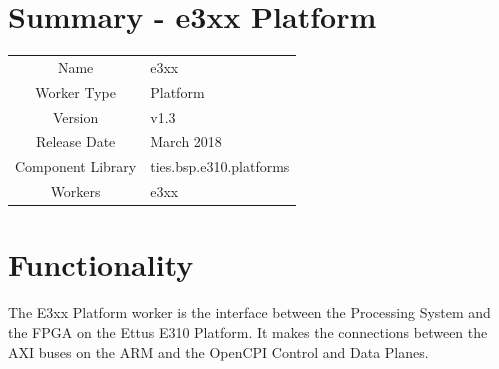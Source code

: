 \documentclass{article}
\author{} %
\date{Version \docVersion} %
\title{\docTitle}
\def\docVersion{1.3}
\def\comp{e3xx}
\def\Comp{e3xx Platform}
\begin{document}
\section*{Summary - \Comp}
\begin{tabular}{|c|M{13.5cm}|}
	\hline
	                  &                                                    \\
	\hline
	Name              & \comp                                              \\
	\hline
	Worker Type       & Platform                                           \\
	\hline
	Version           & v\docVersion \\
	\hline
	Release Date      & March 2018 \\
	\hline
	Component Library & ties.bsp.e310.platforms                                \\
	\hline
	Workers & \comp                                        \\
	\hline
\end{tabular}

\section*{Functionality}
\begin{flushleft}
The E3xx Platform worker is the interface between the Processing System and the FPGA on the Ettus E310 Platform. It makes the connections between the AXI buses on the ARM and the OpenCPI Control and Data Planes. 

\end{flushleft}
\end{document}
